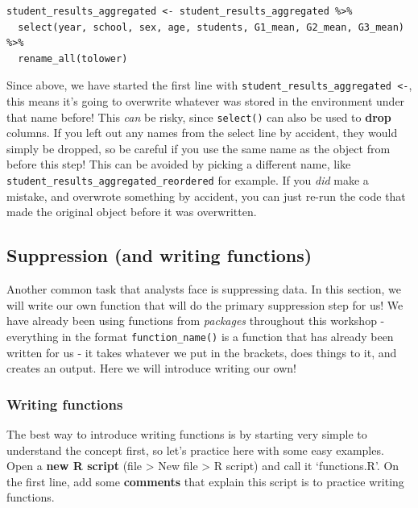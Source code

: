\documentclass[
  12pt,
]{article}
\begin{document}
\begin{verbatim}
student_results_aggregated <- student_results_aggregated %>%
  select(year, school, sex, age, students, G1_mean, G2_mean, G3_mean) %>%
  rename_all(tolower)
\end{verbatim}

Since above, we have started the first line with
\texttt{student\_results\_aggregated\ \textless{}-}, this means it's
going to overwrite whatever was stored in the environment under that
name before! This \emph{can} be risky, since \texttt{select()} can also
be used to \textbf{drop} columns. If you left out any names from the
select line by accident, they would simply be dropped, so be careful if
you use the same name as the object from before this step! This can be
avoided by picking a different name, like
\texttt{student\_results\_aggregated\_reordered} for example. If you
\emph{did} make a mistake, and overwrote something by accident, you can
just re-run the code that made the original object before it was
overwritten.

\hypertarget{suppression-and-writing-functions}{%
\subsection{Suppression (and writing
functions)}\label{suppression-and-writing-functions}}

Another common task that analysts face is suppressing data. In this
section, we will write our own function that will do the primary
suppression step for us! We have already been using functions from
\emph{packages} throughout this workshop - everything in the format
\texttt{function\_name()} is a function that has already been written
for us - it takes whatever we put in the brackets, does things to it,
and creates an output. Here we will introduce writing our own!

\hypertarget{writing-functions}{%
\subsubsection{Writing functions}\label{writing-functions}}

The best way to introduce writing functions is by starting very simple
to understand the concept first, so let's practice here with some easy
examples. Open a \textbf{new R script} (file \textgreater{} New file
\textgreater{} R script) and call it `functions.R'. On the first line,
add some \textbf{comments} that explain this script is to practice
writing functions.
\end{document}
